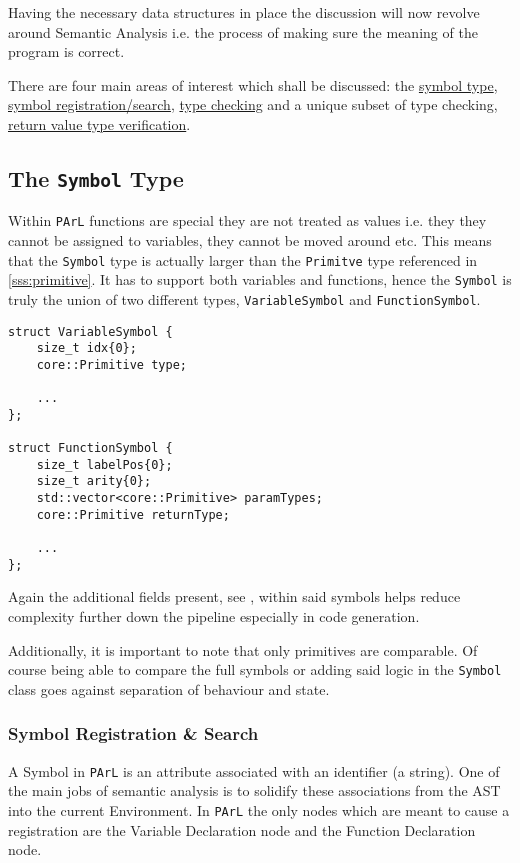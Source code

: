 Having the necessary data structures in place the discussion
will now revolve around Semantic Analysis i.e. the process of
making sure the meaning of the program is correct.

There are four main areas of interest which shall be discussed:
the \ul{symbol type}, \ul{symbol registration/search}, \ul{type
checking} and a unique subset of type checking, \ul{return value
type verification}.

\subsection{The \texttt{Symbol} Type}

Within \texttt{PArL} functions are special they are not treated
as values i.e. they they cannot be assigned to variables, they
cannot be moved around etc. This means that the \texttt{Symbol}
type is actually larger than the \texttt{Primitve} type
referenced in \ref{sss:primitive}. It has to support both
variables and functions, hence the \texttt{Symbol} is truly the
union of two different types, \texttt{VariableSymbol} and
\texttt{FunctionSymbol}.

\begin{lstlisting}[caption={Definitions of
\texttt{VariableSymbol} and \texttt{FunctionSymbol}
(backend/Symbol.hpp)},label=lst:symbols]
struct VariableSymbol {
    size_t idx{0};
    core::Primitive type;

    ...
};

struct FunctionSymbol {
    size_t labelPos{0};
    size_t arity{0};
    std::vector<core::Primitive> paramTypes;
    core::Primitive returnType;

    ...
};
\end{lstlisting}

Again the additional fields present, see ,
within said symbols helps reduce complexity further down the
pipeline especially in code generation.

Additionally, it is important to note that only primitives are
comparable. Of course being able to compare the full symbols or
adding said logic in the \texttt{Symbol} class goes against
separation of behaviour and state.

\subsubsection{Symbol Registration \& Search}

A Symbol in \texttt{PArL} is an attribute associated with an
identifier (a string). One of the main jobs of semantic analysis
is to solidify these associations from the AST into the current
Environment. In \texttt{PArL} the only nodes which are meant to
cause a registration are the Variable Declaration node and the
Function Declaration node.

